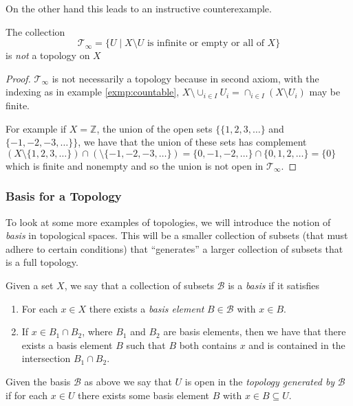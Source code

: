 On the other hand this leads to an instructive counterexample.

\begin{exmp}
  The collection
  \[
    \mathscr{T}_\infty = \{U \mid X \setminus U \text{ is infinite or
      empty or all of } X \}
  \]
  is \emph{not} a topology on $X$
\end{exmp}

\begin{proof}
  $\mathscr{T}_\infty$ is not necessarily a topology because in second
axiom, with the indexing as in example \ref{exmp:countable}, $X
\setminus \cup_{i \in I} U_i = \cap_{i \in I} (X \setminus U_i)$ may
be finite.

  For example if $X = \mathbb{Z}$, the union of the open sets $\{ \{1,
2, 3, \dots \}$ and $\{-1, -2, -3, \dots \} \}$, we have that the
union of these sets has complement $(X \setminus \{1, 2, 3, \dots \})
\cap (\setminus \{-1, -2, -3, \dots \}) = \{0, -1, -2, \dots \} \cap
\{0, 1, 2, \dots \} = \{ 0 \}$ which is finite and nonempty and so the
union is not open in $\mathscr{T}_\infty$.
\end{proof}


\subsubsection{Basis for a Topology}
\label{sec:prelims:topospace:basis}

To look at some more examples of topologies, we will introduce the notion of \emph{basis} in topological spaces. This will be a smaller collection of subsets (that must adhere to certain conditions) that ``generates'' a larger collection of subsets that is a full topology.

\begin{defn}
  Given a set $X$, we say that a collection of subsets $\mathscr{B}$
  is a \emph{basis} if it satisfies
  \begin{enumerate}
  \item For each $x \in X$ there exists a \emph{basis element} $B \in
    \mathscr{B}$ with $x \in B$.
  \item If $x \in B_1 \cap B_2$, where $B_1$ and $B_2$ are basis
    elements, then we have that there exists a basis element $B$ such
    that $B$ both contains $x$ and is contained in the intersection
    $B_1 \cap B_2$.
  \end{enumerate}
  Given the basis $\mathscr{B}$ as above we say that $U$ is open in
  the \emph{topology generated by} $\mathscr{B}$ if for each $x \in U$
  there exists some basis element $B$ with $x \in B \subseteq U$.
\end{defn}

